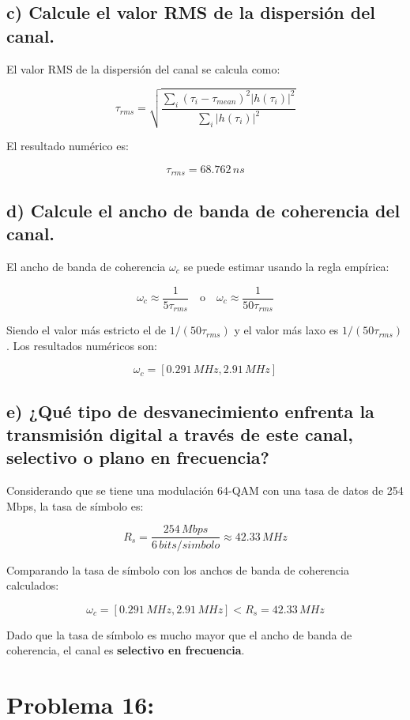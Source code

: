 \documentclass[11pt]{article}
\begin{document}
\subsection*{c) Calcule el valor RMS de la dispersión del canal.}

El valor RMS de la dispersión del canal se calcula como:

\[
\tau_{rms} = \sqrt{\frac{\sum_i (\tau_i - \tau_{mean})^2 |h(\tau_i)|^2}{\sum_i |h(\tau_i)|^2}}
\]

El resultado numérico es:

\[
\tau_{rms} = 68.762 \, ns
\]

\subsection*{d) Calcule el ancho de banda de coherencia del canal.}

El ancho de banda de coherencia $\omega_c$ se puede estimar usando la regla empírica:

\[
\omega_c \approx \frac{1}{5 \tau_{rms}} \quad \text{o} \quad \omega_c \approx \frac{1}{50 \tau_{rms}}
\]

Siendo el valor más estricto el de $1/(50 \tau_{rms})$ y el valor más laxo es $1/(50 \tau_{rms})$. Los resultados numéricos son:

\[
\omega_{c} = \left[ 0.291 \, MHz , 2.91 \, MHz \right]
\]

\subsection*{e) ¿Qué tipo de desvanecimiento enfrenta la transmisión digital a través de este canal, selectivo o plano en frecuencia?}

Considerando que se tiene una modulación 64-QAM con una tasa de datos de 254 Mbps, la tasa de símbolo es:

\[
R_s = \frac{254 \, Mbps}{6 \, bits/simbolo} \approx 42.33 \, MHz
\]

Comparando la tasa de símbolo con los anchos de banda de coherencia calculados:

\[
\omega_{c} = \left[ 0.291 \, MHz , 2.91 \, MHz \right] < R_s = 42.33 \, MHz
\]

Dado que la tasa de símbolo es mucho mayor que el ancho de banda de coherencia, el canal es \textbf{selectivo en frecuencia}.

\section*{Problema 16:}
\end{document}
